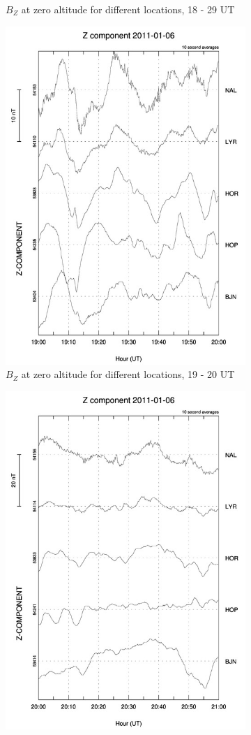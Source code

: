 \documentclass[10pt,a4paper]{article}
\begin{document}
\begin{figure}[h]
\begin{subfigure}[h]{.5\textwidth}
		\caption{$B_Z$ at zero altitude for different locations, 18 - 29 UT}
		\label{mag2}
	\end{subfigure}
	\begin{subfigure}[h]{.5\textwidth}
		\centering
		\includegraphics[width=.8\linewidth]{Z_gram2.jpg}
		\caption{$B_Z$ at zero altitude for different locations, 19 - 20 UT}
		\label{mag3}
	\end{subfigure}
	\begin{subfigure}[h]{.5\textwidth}
		\centering
		\includegraphics[width=.8\linewidth]{Z_gram3.jpg}

\end{subfigure}
\end{figure}
\end{document}
